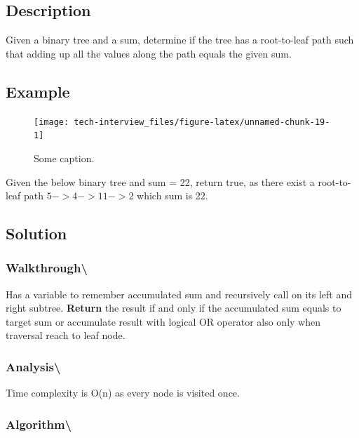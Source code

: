 \documentclass[]{book}
\begin{document}
\hypertarget{description-59}{%
\subsection{Description}\label{description-59}}

Given a binary tree and a sum, determine if the tree has a root-to-leaf path such that adding up all the values
along the path equals the given sum.

\hypertarget{example-57}{%
\subsection{Example}\label{example-57}}

\begin{figure}
\texttt{[image: tech-interview\_files/figure-latex/unnamed-chunk-19-1]} \caption{Some caption.}\label{fig:unnamed-chunk-19}
\end{figure}

Given the below binary tree and sum = 22, return true, as there exist a root-to-leaf path \(5->4->11->2\) which sum
is 22.

\hypertarget{solution-41}{%
\subsection{Solution}\label{solution-41}}

\hypertarget{walkthrough-63}{%
\subsubsection{Walkthrough\textbackslash{}}\label{walkthrough-63}}

Has a variable to remember accumulated sum and recursively call on its left and right subtree. \textbf{Return}
the result if and only if the accumulated sum equals to target sum or accumulate result with logical OR operator
also only when traversal reach to leaf node.

\hypertarget{analysis-70}{%
\subsubsection{Analysis\textbackslash{}}\label{analysis-70}}

Time complexity is O(n) as every node is visited once.

\hypertarget{algorithm-72}{%
\subsubsection{Algorithm\textbackslash{}}\label{algorithm-72}}
\end{document}
